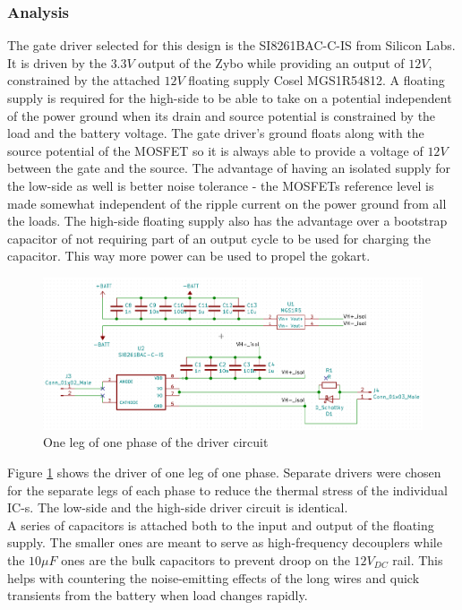 \subsubsection{Analysis}
The gate driver selected for this design is the SI8261BAC-C-IS\cite{Si8261} from Silicon Labs. It is driven by the $3.3V$ output of the Zybo while providing an output of $12V$, constrained by the attached $12V$ floating supply Cosel MGS1R54812\cite{MGS1R5}. A floating supply is required for the high-side to be able to take on a potential independent of the power ground when its drain and source potential is constrained by the load and the battery voltage. The gate driver's ground floats along with the source potential of the MOSFET so it is always able to provide a voltage of $12V$ between the gate and the source. The advantage of having an isolated supply for the low-side as well is better noise tolerance - the MOSFETs reference level is made somewhat independent of the ripple current on the power ground from all the loads. The high-side floating supply also has the advantage over a bootstrap capacitor of not requiring  part of an output cycle to be used for charging the capacitor. This way more power can be used to propel the gokart.

\begin{figure}[H]
	\centering
	\includegraphics[width=1\linewidth]{pictures/hardware/Driver_Board/driver_circuit.png}
	\caption{One leg of one phase of the driver circuit}
	\label{fig:driver_circuit}
\end{figure}

 Figure \ref{fig:driver_circuit} shows the driver of one leg of one phase. Separate drivers were chosen for the separate legs of each phase to reduce the thermal stress of the individual IC-s. The low-side and the high-side driver circuit is identical. \\

A series of capacitors is attached both to the input and output of the floating supply. The smaller ones are meant to serve as high-frequency decouplers while the $10$$\mu$$F$  ones are the bulk capacitors to prevent droop on the $12V_{DC}$ rail. This helps with countering the noise-emitting effects of the long wires and quick transients from the battery when load changes rapidly. \\

